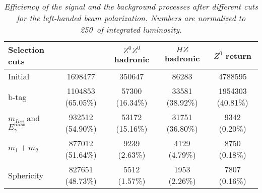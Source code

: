 \begin{table}[H]
        \begin{center}
        \begin{tabular}{l c c c c}
        \hline
	Selection cuts 					& \bbbar 			& $Z^0Z^0$ hadronic & $HZ$ hadronic 	&  $Z^0$ return   \\
	\hline
	Initial 							& 1698477 			& 350647 			& 86283 			& 4788595 \\
	b-tag  							& 1104853 (65.05\%) & 57300 (16.34\%) 	& 33581 (38.92\%) 	& 1954303 (40.81\%) \\
	$m_{Inv}$ and $E_\gamma^{max}$  	& 932512 (54.90\%) 	& 53172 (15.16\%) 	& 31751 (36.80\%) 	& 9342 (0.20\%) \\
	$m_1+m_2$  						& 877012 (51.64\%) 	& 9239 (2.63\%) 	& 4129 (4.79\%) 	& 8750 (0.18\%) \\
	Sphericity  						& 827651 (48.73\%) 	& 5512 (1.57\%) 	& 1953 (2.26\%) 	& 7807 (0.16\%) \\
        \hline
        \end{tabular}
        \end{center}
        \caption{\sl Efficiency of the signal and the background processes after different cuts for the left-handed beam polarization. Numbers are normalized to 250\ifb\ of integrated luminosity.}
        \label{table:bbbarselection} %
\end{table}
